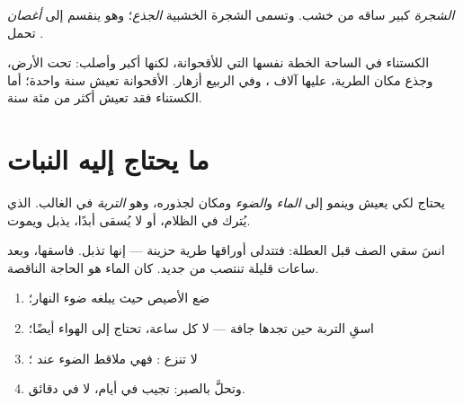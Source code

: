 \begin{definition}[الشجرة]\label{def:g1:plants-around-us:tree}
\emph{الشجرة}  كبير ساقه من خشب. وتسمى  الشجرة
الخشبية \emph{الجذع}؛ وهو ينقسم إلى
\emph{أغصان} تحمل .
\end{definition}

\begin{example}\label{ex:g1:plants-around-us:tree}
 الكستناء في الساحة الخطة نفسها التي للأقحوانة، لكنها أكبر
وأصلب:  تحت الأرض، وجذع مكان  الطرية،  عليها آلاف
، وفي الربيع أزهار. الأقحوانة تعيش سنة واحدة؛ أما الكستناء
فقد تعيش أكثر من مئة سنة.
\end{example}

\section{ما يحتاج إليه النبات}

\begin{proposition}\label{prop:g1:plants-around-us:needs}
يحتاج  لكي يعيش وينمو إلى \emph{الماء} و\emph{الضوء} ومكان
لجذوره، وهو \emph{التربة} في الغالب.  الذي
يُترك في الظلام، أو لا يُسقى أبدًا، يذبل ويموت.
\end{proposition}
\admitted

\begin{example}\label{ex:g1:plants-around-us:wilt}
انسَ سقي  الصف قبل العطلة: فتتدلى أوراقها طرية حزينة --- إنها
تذبل. فاسقها، وبعد ساعات قليلة تنتصب  من جديد. كان الماء هو
الحاجة الناقصة.
\end{example}

\begin{method}\label{met:g1:plants-around-us:care}
\begin{enumerate}
  \item ضع الأصيص حيث يبلغه ضوء النهار؛
  \item اسقِ التربة حين تجدها جافة --- لا كل ساعة،  تحتاج
        إلى الهواء أيضًا؛
  \item لا تنزع : فهي ملاقط الضوء عند ؛
  \item وتحلَّ بالصبر:  تجيب في أيام، لا في دقائق.
\end{enumerate}
\end{method}

